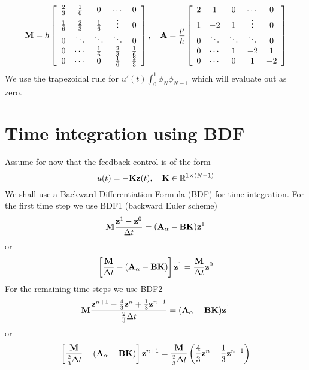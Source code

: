 \documentclass[12pt]{article}
\begin{document}
\[
 {\mathbf M} = h \left[\begin{array}{ccccc}
         \frac{2}{3} & \frac{1}{6} & 0 & \cdots & 0 \\
         \frac{1}{6} & \frac{2}{3} & \frac{1}{6}  & \vdots & 0 \\
         0 & \ddots  & \ddots & \ddots & 0 \\
         0 & \cdots & \frac{1}{6} & \frac{2}{3} & \frac{1}{6} \\
         0 & \cdots & 0 & \frac{1}{6} & \frac{2}{3}
        \end{array} \right] , \quad
 {\mathbf A} = \frac{\mu}{h} \left[\begin{array}{ccccc}
         \-2 & 1 & 0 & \cdots & 0 \\
         1 & -2 & 1  & \vdots & 0 \\
         0 & \ddots  & \ddots & \ddots & 0 \\
         0 & \cdots & 1 & -2 & 1 \\
         0 & \cdots & 0 & 1 & -2
        \end{array} \right]       
\]
We use the trapezoidal rule for $u'(t) \int_0^1 \phi_N \phi_{N-1}$ which will evaluate out as zero. 

\section{Time integration using BDF}
Assume for now that the feedback control is of the form 
\[
 u(t) = - {\mathbf K} {\mathbf z}(t), \quad {\mathbf K} \in \mathbb{R}^{1\times(N-1)}
\]
We shall use a Backward Differentiation Formula (BDF) for time integration. For the first time step we use BDF1 (backward Euler scheme)
\[
 {\mathbf M} \frac{{\mathbf z}^1 - {\mathbf z}^0}{\Delta t} = ({\mathbf A}_\alpha - {\mathbf B} {\mathbf K}){\mathbf z}^1
\]
or
\[
 \left[ \frac{{\mathbf M} }{\Delta t} - ({\mathbf A}_\alpha - {\mathbf B} {\mathbf K}) \right] {\mathbf z}^1 =  \frac{{\mathbf M}}{\Delta t} {\mathbf z}^0 
\]
For the remaining time steps we use BDF2
\[
 {\mathbf M} \frac{{\mathbf z}^{n+1} - \frac{4}{3} {\mathbf z}^{n} + \frac{1}{3} {\mathbf z}^{n-1}}{\frac{2}{3}\Delta t} = ({\mathbf A}_\alpha - {\mathbf B} {\mathbf K}){\mathbf z}^1
\]
or
\[
 \left[ \frac{{\mathbf M} }{\frac{2}{3}\Delta t} - ({\mathbf A}_\alpha - {\mathbf B} {\mathbf K}) \right] {\mathbf z}^{n+1} =  \frac{{\mathbf M}}{\frac{2}{3}\Delta t}\left( \frac{4}{3} {\mathbf z}^{n} - \frac{1}{3} {\mathbf z}^{n-1} \right)
\]

\end{document}
